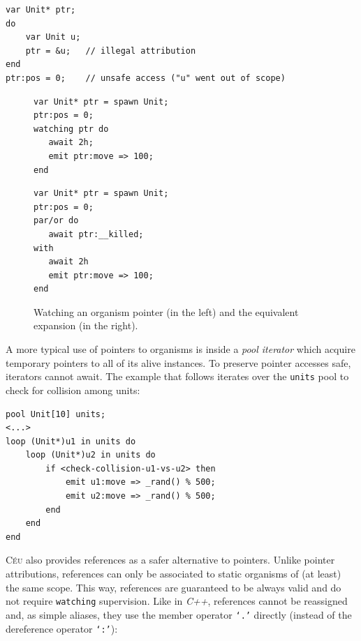 \documentclass{sigplanconf}
\newcommand{\CEU}{\textsc{C\'{e}u}\xspace}
\newcommand{\code}[1] {{\small{\texttt{#1}}}}
\newcommand{\1}{\;}
\newcommand{\2}{\;\;}
\newcommand{\3}{\;\;\;}
\newcommand{\5}{\;\;\;\;\;}
\begin{document}
\begin{lstlisting}
var Unit* ptr;
do
    var Unit u;
    ptr = &u;   // illegal attribution
end
ptr:pos = 0;    // unsafe access ("u" went out of scope)
\end{lstlisting}

\begin{figure}%
\begin{minipage}[t]{0.51\linewidth}
\begin{lstlisting}
var Unit* ptr = spawn Unit;
ptr:pos = 0;
watching ptr do
   await 2h;
   emit ptr:move => 100;
end
\end{lstlisting}
\end{minipage}
%
\begin{minipage}[t]{0.48\linewidth}
\begin{lstlisting}
var Unit* ptr = spawn Unit;
ptr:pos = 0;
par/or do
   await ptr:__killed;
with
   await 2h
   emit ptr:move => 100;
end
\end{lstlisting}
\end{minipage}
\caption{ Watching an organism pointer (in the left) and the equivalent 
expansion (in the right).
\label{lst.watching}
}
\end{figure}

A more typical use of pointers to organisms is inside a \emph{pool iterator} 
which acquire temporary pointers to all of its alive instances.
To preserve pointer accesses safe, iterators cannot await.
The example that follows iterates over the \code{units} pool to check for 
collision among units:

\newpage

\begin{lstlisting}
pool Unit[10] units;
<...>
loop (Unit*)u1 in units do
    loop (Unit*)u2 in units do
        if <check-collision-u1-vs-u2> then
            emit u1:move => _rand() % 500;
            emit u2:move => _rand() % 500;
        end
    end
end
\end{lstlisting}

\CEU also provides references as a safer alternative to pointers.
Unlike pointer attributions, references can only be associated to static 
organisms of (at least) the same scope.
This way, references are guaranteed to be always valid and do not require
\code{watching} supervision.
Like in \emph{C++}, references cannot be reassigned and, as simple aliases, 
they use the member operator \code{`.'} directly (instead of the dereference 
operator \code{`:'}):
\end{document}
